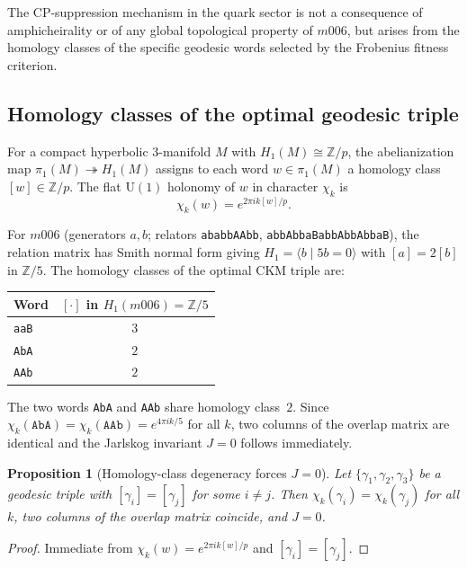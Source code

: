 \documentclass[12pt]{article}
\newtheorem{proposition}[theorem]{Proposition}
\theoremstyle{definition}
\begin{document}
The CP-suppression mechanism in the quark sector is not a consequence
of amphicheirality or of any global topological property of $m006$,
but arises from the homology classes of the specific geodesic words
selected by the Frobenius fitness criterion.

\subsection{Homology classes of the optimal geodesic triple}

For a compact hyperbolic 3-manifold $M$ with $H_1(M)\cong\mathbb{Z}/p$,
the abelianization map $\pi_1(M)\twoheadrightarrow H_1(M)$ assigns to
each word $w\in\pi_1(M)$ a homology class $[w]\in\mathbb{Z}/p$.
The flat $\mathrm{U}(1)$ holonomy of $w$ in character $\chi_k$ is
\[
  \chi_k(w) = e^{2\pi i k [w]/p}.
\]

For $m006$ (generators $a,b$; relators \texttt{ababbAAbb},
\texttt{abbAbbaBabbAbbAbbaB}), the relation matrix has Smith normal form
giving $H_1 = \langle b\mid 5b=0\rangle$ with $[a]=2[b]$ in $\mathbb{Z}/5$.
The homology classes of the optimal CKM triple are:
\begin{center}\small
\begin{tabular}{lc}
\toprule
Word & $[\cdot]$ in $H_1(m006)=\mathbb{Z}/5$ \\
\midrule
\texttt{aaB} & $3$ \\
\texttt{AbA} & $2$ \\
\texttt{AAb} & $2$ \\
\bottomrule
\end{tabular}
\end{center}

The two words \texttt{AbA} and \texttt{AAb} share homology class~$2$.
Since $\chi_k(\texttt{AbA})=\chi_k(\texttt{AAb})=e^{4\pi ik/5}$ for all $k$,
two columns of the overlap matrix are identical and the Jarlskog
invariant $J=0$ follows immediately.

\begin{proposition}[Homology-class degeneracy forces $J=0$]
\label{prop:hom_class}
Let $\{\gamma_1,\gamma_2,\gamma_3\}$ be a geodesic triple with
$[\gamma_i]=[\gamma_j]$ for some $i\neq j$.
Then $\chi_k(\gamma_i)=\chi_k(\gamma_j)$ for all $k$,
two columns of the overlap matrix coincide, and $J=0$.
\end{proposition}

\begin{proof}
Immediate from $\chi_k(w)=e^{2\pi ik[w]/p}$ and $[\gamma_i]=[\gamma_j]$.
\end{proof}
\end{document}
